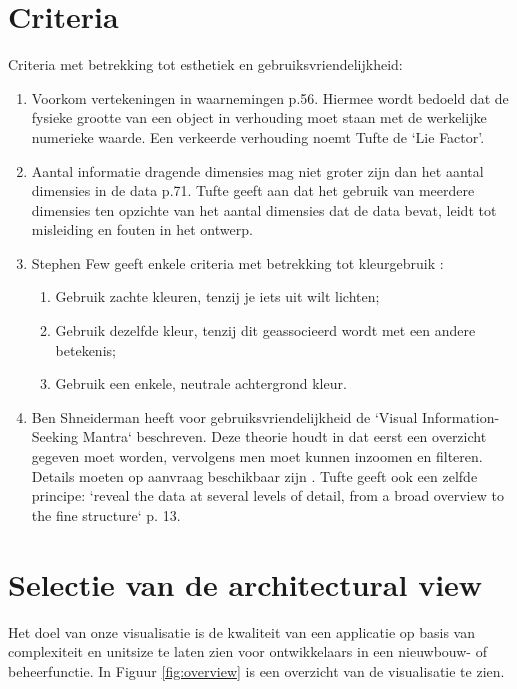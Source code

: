 \documentclass[a4paper]{article}
\begin{document}
\section{Criteria}
Criteria met betrekking tot esthetiek en gebruiksvriendelijkheid:
\begin{enumerate}
\item Voorkom vertekeningen in waarnemingen \cite{tufte2014visual} p.56. Hiermee wordt bedoeld dat de fysieke grootte van een object in verhouding moet staan met de werkelijke numerieke waarde. Een verkeerde verhouding noemt Tufte de `Lie Factor'.
\item Aantal informatie dragende dimensies mag niet groter zijn dan het aantal dimensies in de data \cite{tufte2014visual} p.71. Tufte geeft aan dat het gebruik van meerdere dimensies ten opzichte van het aantal dimensies dat de data bevat, leidt tot misleiding en fouten in het ontwerp.

\item Stephen Few geeft enkele criteria met betrekking tot kleurgebruik \cite{B}:
\begin{enumerate}
\item Gebruik zachte kleuren, tenzij je iets uit wilt lichten;
\item Gebruik dezelfde kleur, tenzij dit geassocieerd wordt met een andere betekenis; 
\item Gebruik een enkele, neutrale achtergrond kleur.
\end{enumerate}

\item Ben Shneiderman heeft voor gebruiksvriendelijkheid de `Visual Information-Seeking Mantra` beschreven. Deze theorie houdt in dat eerst een overzicht gegeven moet worden, vervolgens men moet kunnen inzoomen en filteren. Details moeten op aanvraag beschikbaar zijn \cite{A}. Tufte geeft ook een zelfde principe: `reveal the data at several levels of detail, from a broad overview to the fine structure` \cite{tufte2014visual} p. 13.
\end{enumerate}


\section{Selectie van de architectural view}
Het doel van onze visualisatie is de kwaliteit van een applicatie op basis van complexiteit en unitsize te laten zien voor ontwikkelaars in een nieuwbouw- of beheerfunctie. In Figuur \ref{fig:overview} is een overzicht van de visualisatie te zien.
\end{document}
